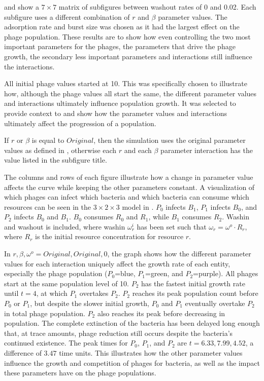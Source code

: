  and  show a $7\times7$ matrix of subfigures between washout rates of 0 and 0.02. 
Each subfigure uses a different combination of $r$ and $\beta$ parameter values. 
The adsorption rate and burst size was chosen as it had the largest effect on the phage population. 
These results are to show how even controlling the two most important parameters for the phages, the parameters that drive the phage growth, the secondary less important parameters and interactions still influence the interactions. 

All initial phage values started at 10. 
This was specifically chosen to illustrate how, although the phage values all start the same, the different parameter values and interactions ultimately influence population growth. 
It was selected to provide context to and show how the parameter values and interactions ultimately affect the progression of a population. 

If $r$ or $\beta$ is equal to $Original$, then the simulation uses the original parameter values as defined in , otherwise each $r$ and each $\beta$ parameter interaction has the value listed in the subfigure title. 

The columns and rows of each figure illustrate how a change in parameter value affects the curve while keeping the other parameters constant. 
A visualization of which phages can infect which bacteria and which bacteria can consume which resources can be seen in the $3 \times 2\times 3$ model in . 
$P_0$ infects $B_1$, $P_1$ infects $B_0$, and $P_2$ infects $B_0$ and $B_1$. 
$B_0$ consumes $R_0$ and $R_1$, while $B_1$ consumes $R_2$. 
Washin and washout is included, where washin $\omega^i_r$ has been set such that $\omega_r = \omega^o \cdot R_r$, where $R_r$ is the initial resource concentration for resource $r$. 

In $r, \beta, \omega^o=Original, Original, 0$, the graph shows how the different parameter values for each interaction uniquely affect the growth rate of each entity, especially the phage population ($P_0$=blue, $P_1$=green, and $P_2$=purple). 
All phages start at the same population level of 10. 
$P_2$ has the fastest initial growth rate until $t=4$, at which $P_1$ overtakes $P_2$. 
$P_2$ reaches its peak population count before $P_0$ or $P_1$, but despite the slower initial growth, $P_0$ and $P_1$ eventually overtake $P_2$ in total phage population. 
$P_2$ also reaches its peak before decreasing in population. 
The complete extinction of the bacteria has been delayed long enough that, at trace amounts, phage reduction still occurs despite the bacteria's continued existence. 
The peak times for $P_0$, $P_1$, and $P_2$ are $t=6.33, 7.99, 4.52$, a difference of $3.47$ time units. 
This illustrates how the other parameter values influence the growth and competition of phages for bacteria, as well as the impact these parameters have on the phage populations. 

